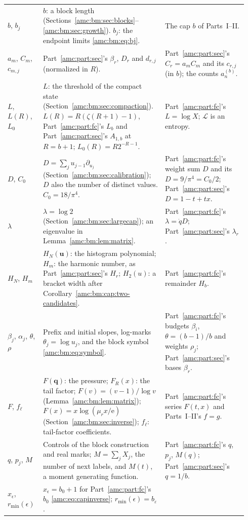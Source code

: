 \documentclass[11pt,letterpaper]{article}
\theoremstyle{remark}\newtheorem{remark}[theorem]{Remark}
\newcommand{\ee}{\mathrm e}
\newcommand{\cL}{\mathcal L}
\newcommand{\bu}{\boldsymbol u}
\begin{document}
{\begin{longtable}{@{}>{\raggedright\arraybackslash}p{0.13\linewidth}>{\raggedright\arraybackslash}p{0.48\linewidth}>{\raggedright\arraybackslash}p{0.33\linewidth}@{}}
$b$, $b_j$ & $b$: a block length (Sections~\ref{amc:bm:sec:blocks}--\ref{amc:bm:sec:growth}). $b_j$: the endpoint limits \eqref{amc:bm:eq:bj}. & The cap $b$ of Parts~I--II.\\
$a_m$, $C_m$, $c_{m,j}$ & Part~\ref{amc:part:sec}'s $\beta_r$, $D_r$ and $d_{r,j}$ (normalized in $R$). & Part~\ref{amc:part:sec}'s $C_r=a_mC_m$ and its $c_{r,j}$ (in $b$); the counts $a_n^{(b)}$.\\
$L$, $L(R)$, $L_0$ & $L$: the threshold of the compact state (Section~\ref{amc:bm:sec:compaction}). $L(R)=R(\zeta(R+1)-1)$, Part~\ref{amc:part:fc}'s $L_b$ and Part~\ref{amc:part:sec}'s $A_{1,b}$ at $R=b+1$; $L_0(R)=R2^{-R-1}$. & Part~\ref{amc:part:fc}'s $L=\log X$; $\cL$ is an entropy.\\
$D$, $C_0$ & $D=\sum_ju_{j-1}\partial_{u_j}$ (Section~\ref{amc:bm:sec:calibration}); $D$ also the number of distinct values. $C_0=18/\pi^4$. & Part~\ref{amc:part:fc}'s weight sum $D$ and its $D=9/\pi^4=C_0/2$; Part~\ref{amc:part:sec}'s $D=1-t+tx$.\\
$\lambda$ & $\lambda=\log2$ (Section~\ref{amc:bm:sec:largecap}); an eigenvalue in Lemma~\ref{amc:bm:lem:matrix}. & Part~\ref{amc:part:fc}'s $\lambda=\dot qD$; Part~\ref{amc:part:sec}'s $\lambda_r$.\\
$H_N$, $H_m$ & $H_N(\bu)$: the histogram polynomial; $H_m$: the harmonic number, as Part~\ref{amc:part:sec}'s $H_r$; $H_2(u)$: a bracket width after Corollary~\ref{amc:bm:cap:two-candidates}. & Part~\ref{amc:part:fc}'s remainder $H_b$.\\
$\beta_j$, $\alpha_j$, $\theta$, $\rho$ & Prefix and initial slopes, log-marks $\theta_j=\log u_j$, and the block symbol \eqref{amc:bm:eq:symbol}. & Part~\ref{amc:part:fc}'s budgets $\beta_i$, $\theta=(b-1)/b$ and weights $\rho_j$; Part~\ref{amc:part:sec}'s bases $\beta_r$.\\
$F$, $f_\ell$ & $F(\boldsymbol q)$: the pressure; $F_R(x)$: the tail factor; $F(v)=(v-1)/\log v$ (Lemma~\ref{amc:bm:lem:matrix}); $F(x)=x\log(\mu_rx/\ee)$ (Section~\ref{amc:bm:sec:inverse}); $f_\ell$: tail-factor coefficients. & Part~\ref{amc:part:fc}'s series $F(t,x)$ and Parts~I--II's $f=g$.\\
$q$, $p_j$, $M$ & Controls of the block construction and real marks; $M=\sum_jX_j$, the number of next labels, and $M(t)$, a moment generating function. & Part~\ref{amc:part:fc}'s $q$, $p_j$, $M(q)$; Part~\ref{amc:part:sec}'s $q=1/b$.\\
$x_\epsilon$, $r_{\min}(\epsilon)$ & $x_\epsilon=b_0+1$ for Part~\ref{amc:part:fc}'s $b_0$ \eqref{amc:eq:capinverse}; $r_{\min}(\epsilon)=b_\varepsilon$. & \\
\end{longtable}
}
\end{document}
